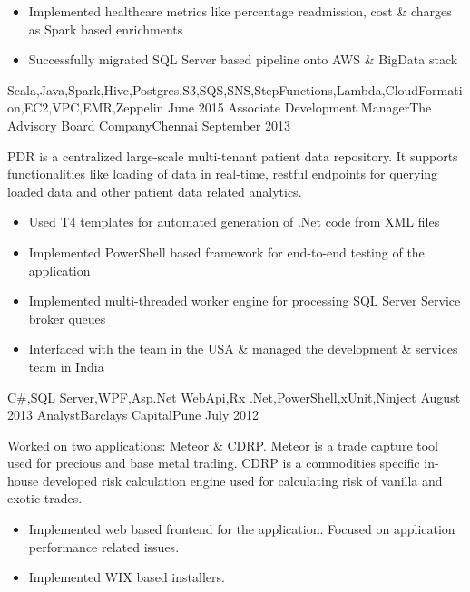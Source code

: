 \begin{experiences}
{\begin{itemize}
    	              	\item Implemented healthcare metrics like percentage readmission, cost \& charges as Spark based enrichments                
    	              	\item Successfully migrated SQL Server based pipeline onto AWS \& BigData stack
    	              \end{itemize}
                  }
              {Scala,Java,Spark,Hive,Postgres,S3,SQS,SNS,StepFunctions,Lambda,CloudFormation,EC2,VPC,EMR,Zeppelin}
  \emptySeparator
  \experience
    {June 2015}     {Associate Development Manager}{The Advisory Board Company}{Chennai}
    {September 2013}    {
    	              PDR is a centralized large-scale multi-tenant patient data repository. It supports functionalities like loading of data in real-time, restful endpoints for querying loaded data and other patient data related analytics.
                      \begin{itemize}
                        \item Used T4 templates for automated generation of .Net code from XML files
                        \item Implemented PowerShell based framework for end-to-end testing of the application
                        \item Implemented multi-threaded worker engine for processing SQL Server Service broker queues
                        \item Interfaced with the team in the USA \& managed the development \& services team in India
                      \end{itemize}
                    }
                    {C\#,SQL Server,WPF,Asp.Net WebApi,Rx .Net,PowerShell,xUnit,Ninject}
  \emptySeparator
  \experience
  {August 2013}     {Analyst}{Barclays Capital}{Pune}
  {July 2012}   	{
  					  Worked on two applications: Meteor \& CDRP. Meteor is a trade capture tool used for precious and base metal trading. CDRP is a commodities specific in-house
  					  developed risk calculation engine used for calculating risk of vanilla and exotic trades.
                      \begin{itemize}
                        \item Implemented web based frontend for the application. Focused on application performance related issues.
                        \item Implemented WIX based installers.
                      \end{itemize}
                    }

\end{experiences}
